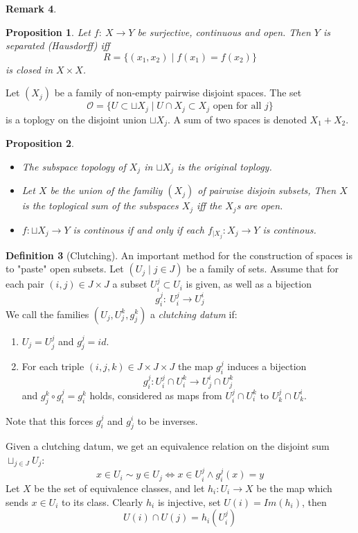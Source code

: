 \documentclass[11pt,a4paper]{article}
\theoremstyle{definition}
\newtheorem{definition}{Definition}[section]
\newtheorem{remark}[definition]{Remark}
\theoremstyle{plain}
\newtheorem{proposition}[definition]{Proposition}
\theoremstyle{remark}
\begin{document}
\begin{remark}
\begin{proposition}
  Let $f \colon \: X \to Y$ be surjective, continuous and open. Then $Y$ is separated (Hausdorff) iff 
  $$R = \{(x_1, x_2) \mid f(x_1) = f(x_2)\}$$
  is closed in $X \times X$. 
\end{proposition}

Let $(X_j)$ be a family of non-empty pairwise disjoint spaces. The set 
$$\mathcal{O} = \{U \subset \sqcup X_j \mid U \cap X_j \subset X_j \text{ open for all } j\}$$
is a toplogy on the disjoint union $\sqcup X_j$. A sum of two spaces is denoted $X_1 + X_2$. 

\begin{proposition}
  \begin{itemize}
    \item The subspace topology of $X_j$ in $\sqcup X_j$ is the original toplogy. 
    \item Let $X$ be the union of the familiy $(X_j)$ of pairwise disjoin subsets, Then $X$ is the 
    toplogical sum of the subspaces $X_j$ iff the $X_j$s are open. 
    \item $f \colon \sqcup X_j \to Y$ is continous if and only if each $f_{\mid X_j} \colon X_j \to Y$ is continous. 
  \end{itemize}
\end{proposition}

\begin{definition}[Clutching]
  An important method for the construction of spaces is to "paste" open subsets. 
  Let $(U_j \mid j \in J)$ be a family of sets. Assume that for each pair $(i, j) \in J \times J$ a subset $U^j_i \subset U_i$ is given, 
  as well as a bijection 
  $$g_i^j \colon \: U_i^j \to U_j^i$$
  We call the families $(U_j, U_j^k, g_j^k)$ a \emph{clutching datum} if: 
  \begin{enumerate}
    \item $U_j = U_j^j$ and $g_j^j = id$. 
    \item For each triple $(i,j,k) \in J \times J \times J$ the map $g_i^j$ induces a bijection 
    $$g_i^j \colon U_i^j \cap U_i^k \to U_j^i \cap U_j^k$$
    and $g_j^k \circ g_i^j = g_i^k$ holds, considered as maps from $U_i^j \cap U_i^k$ to $U_k^j \cap U_k^i$. \\
  \end{enumerate}  
  Note that this forces $g_i^j$ and $g_j^i$ to be inverses. 
\end{definition}

Given a clutching datum, we get an equivalence relation on the disjoint sum $\sqcup_{j \in J} U_j$: 
$$x \in U_i \sim y \in U_j \iff x \in U_i^j \land g_i^j(x) = y$$
Let $X$ be the set of equivalence classes, and let $h_i \colon U_i \to X$ be the map which sends 
$x \in U_i$ to its class. Clearly $h_i$ is injective, set $U(i) = Im(h_i)$, then 
$$U(i) \cap U(j) = h_i(U_i^j)$$


\end{remark}
\end{document}
